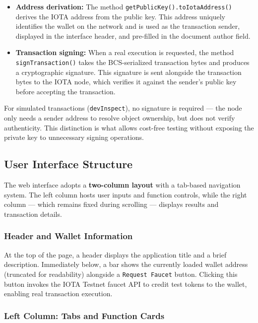 \documentclass[12pt,a4paper]{article}
\begin{document}
\begin{itemize}
    \item \textbf{Address derivation:} The method \texttt{getPublicKey().toIotaAddress()} derives the IOTA address from the public key. This address uniquely identifies the wallet on the network and is used as the transaction sender, displayed in the interface header, and pre-filled in the document author field.
    \item \textbf{Transaction signing:} When a real execution is requested, the method \texttt{signTransaction()} takes the BCS-serialized transaction bytes and produces a cryptographic signature. This signature is sent alongside the transaction bytes to the IOTA node, which verifies it against the sender's public key before accepting the transaction.
\end{itemize}

For simulated transactions (\texttt{devInspect}), no signature is required --- the node only needs a sender address to resolve object ownership, but does not verify authenticity. This distinction is what allows cost-free testing without exposing the private key to unnecessary signing operations.

\subsection{User Interface Structure}

The web interface adopts a \textbf{two-column layout} with a tab-based navigation system. The left column hosts user inputs and function controls, while the right column --- which remains fixed during scrolling --- displays results and transaction details.

\subsubsection{Header and Wallet Information}

At the top of the page, a header displays the application title and a brief description. Immediately below, a bar shows the currently loaded wallet address (truncated for readability) alongside a \texttt{Request Faucet} button. Clicking this button invokes the IOTA Testnet faucet API to credit test tokens to the wallet, enabling real transaction execution.

\subsubsection{Left Column: Tabs and Function Cards}
\end{document}

